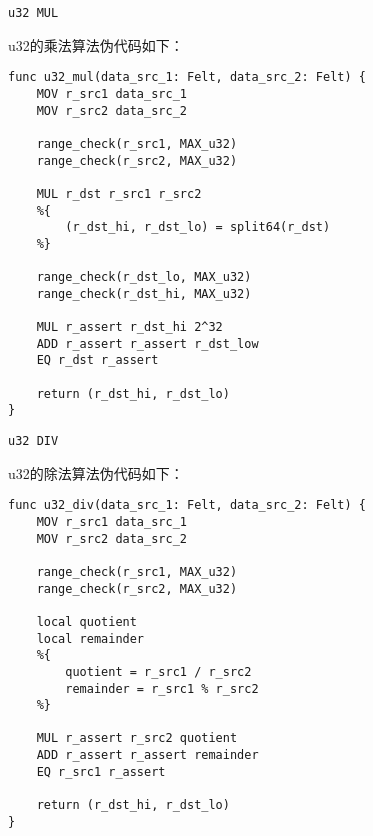 \verb|u32 MUL|

u32的乘法算法伪代码如下：

\begin{lstlisting}[language={}]
func u32_mul(data_src_1: Felt, data_src_2: Felt) {
    MOV r_src1 data_src_1
    MOV r_src2 data_src_2

    range_check(r_src1, MAX_u32)
    range_check(r_src2, MAX_u32)

    MUL r_dst r_src1 r_src2
    %{
        (r_dst_hi, r_dst_lo) = split64(r_dst)
    %}

    range_check(r_dst_lo, MAX_u32)
    range_check(r_dst_hi, MAX_u32)

    MUL r_assert r_dst_hi 2^32
    ADD r_assert r_assert r_dst_low
    EQ r_dst r_assert

    return (r_dst_hi, r_dst_lo)
}
\end{lstlisting}


\verb|u32 DIV|

u32的除法算法伪代码如下：

\begin{lstlisting}[language={}]
func u32_div(data_src_1: Felt, data_src_2: Felt) {
    MOV r_src1 data_src_1
    MOV r_src2 data_src_2

    range_check(r_src1, MAX_u32)
    range_check(r_src2, MAX_u32)

    local quotient
    local remainder
    %{
        quotient = r_src1 / r_src2
        remainder = r_src1 % r_src2
    %}

    MUL r_assert r_src2 quotient
    ADD r_assert r_assert remainder
    EQ r_src1 r_assert

    return (r_dst_hi, r_dst_lo)
}
\end{lstlisting}
